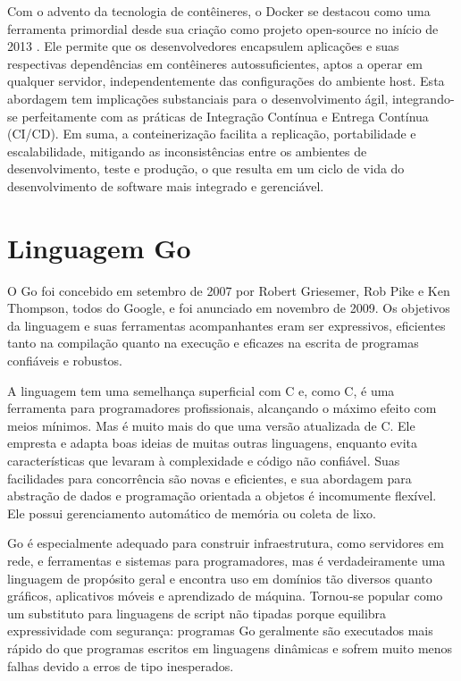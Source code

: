 \documentclass[12pt, %
openright, 
oneside, %
a4paper,    %
brazil]{facom-ufu-abntex2}
\begin{document}
Com o advento da tecnologia de contêineres, o Docker se destacou como uma
ferramenta primordial desde sua criação como projeto open-source no início de
2013 \cite{merkel2014}. Ele permite que os desenvolvedores encapsulem
aplicações e suas respectivas dependências em contêineres autossuficientes,
aptos a operar em qualquer servidor, independentemente das configurações do
ambiente host. Esta abordagem tem implicações substanciais para o
desenvolvimento ágil, integrando-se perfeitamente com as práticas de Integração
Contínua e Entrega Contínua (CI/CD). Em suma, a conteinerização facilita a
replicação, portabilidade e escalabilidade, mitigando as inconsistências entre
os ambientes de desenvolvimento, teste e produção, o que resulta em um ciclo de
vida do desenvolvimento de software mais integrado e gerenciável.

\section{Linguagem Go}

O Go foi concebido em setembro de 2007 por Robert Griesemer, Rob Pike e Ken
Thompson, todos do Google, e foi anunciado em novembro de 2009. Os objetivos da
linguagem e suas ferramentas acompanhantes eram ser expressivos, eficientes
tanto na compilação quanto na execução e eficazes na escrita de programas
confiáveis e robustos.

A linguagem tem uma semelhança superficial com C e, como C, é uma ferramenta
para programadores profissionais, alcançando o máximo efeito com meios mínimos.
Mas é muito mais do que uma versão atualizada de C. Ele empresta e adapta boas
ideias de muitas outras linguagens, enquanto evita características que levaram
à complexidade e código não confiável. Suas facilidades para concorrência são
novas e eficientes, e sua abordagem para abstração de dados e programação
orientada a objetos é incomumente flexível. Ele possui gerenciamento automático
de memória ou coleta de lixo.

Go é especialmente adequado para construir infraestrutura, como servidores em
rede, e ferramentas e sistemas para programadores, mas é verdadeiramente uma
linguagem de propósito geral e encontra uso em domínios tão diversos quanto
gráficos, aplicativos móveis e aprendizado de máquina. Tornou-se popular como
um substituto para linguagens de script não tipadas porque equilibra
expressividade com segurança: programas Go geralmente são executados mais
rápido do que programas escritos em linguagens dinâmicas e sofrem muito menos
falhas devido a erros de tipo inesperados.
\end{document}
